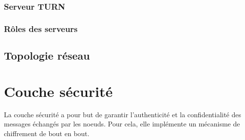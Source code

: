 \subsubsection{Serveur TURN}


\subsubsection{Rôles des serveurs}


\subsection{Topologie réseau}




\section{Couche sécurité}
\label{sec:mute-couche-securite}

La couche sécurité a pour but de garantir l'authenticité et la confidentialité des messages échangés par les noeuds.
Pour cela, elle implémente un mécanisme de chiffrement de bout en bout.

